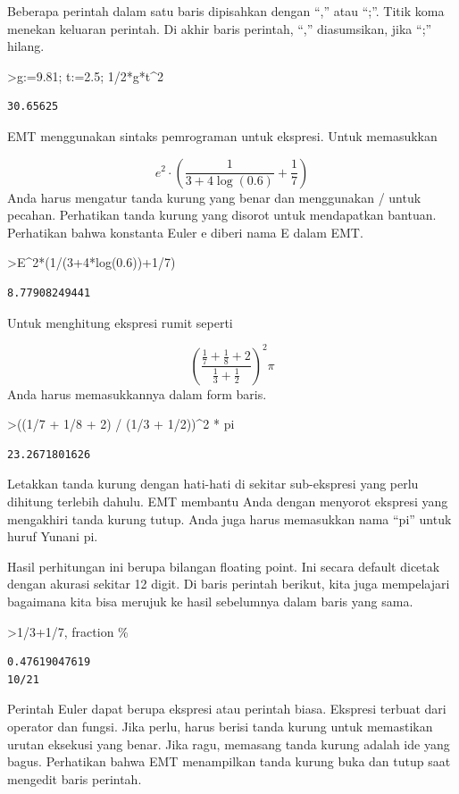 \documentclass[
]{book}
\begin{document}
Beberapa perintah dalam satu baris dipisahkan dengan ``,'' atau ``;''. Titik koma menekan keluaran perintah. Di akhir baris perintah, ``,'' diasumsikan, jika ``;'' hilang.

\textgreater g:=9.81; t:=2.5; 1/2*g*t\^{}2

\begin{verbatim}
30.65625
\end{verbatim}

EMT menggunakan sintaks pemrograman untuk ekspresi. Untuk memasukkan

\[e^2 \cdot \left( \frac{1}{3+4 \log(0.6)}+\frac{1}{7} \right)\]Anda harus mengatur tanda kurung yang benar dan menggunakan / untuk pecahan. Perhatikan tanda kurung yang disorot untuk mendapatkan bantuan. Perhatikan bahwa konstanta Euler e diberi nama E dalam EMT.

\textgreater E\^{}2*(1/(3+4*log(0.6))+1/7)

\begin{verbatim}
8.77908249441
\end{verbatim}

Untuk menghitung ekspresi rumit seperti

\[\left(\frac{\frac17 + \frac18 + 2}{\frac13 + \frac12}\right)^2 \pi\]Anda harus memasukkannya dalam form baris.

\textgreater((1/7 + 1/8 + 2) / (1/3 + 1/2))\^{}2 * pi

\begin{verbatim}
23.2671801626
\end{verbatim}

Letakkan tanda kurung dengan hati-hati di sekitar sub-ekspresi yang perlu dihitung terlebih dahulu. EMT membantu Anda dengan menyorot ekspresi yang mengakhiri tanda kurung tutup. Anda juga harus memasukkan nama ``pi'' untuk huruf Yunani pi.

Hasil perhitungan ini berupa bilangan floating point. Ini secara default dicetak dengan akurasi sekitar 12 digit. Di baris perintah berikut, kita juga mempelajari bagaimana kita bisa merujuk ke hasil sebelumnya dalam baris yang sama.

\textgreater1/3+1/7, fraction \%

\begin{verbatim}
0.47619047619
10/21
\end{verbatim}

Perintah Euler dapat berupa ekspresi atau perintah biasa. Ekspresi terbuat dari operator dan fungsi. Jika perlu, harus berisi tanda kurung untuk memastikan urutan eksekusi yang benar. Jika ragu, memasang tanda kurung adalah ide yang bagus. Perhatikan bahwa EMT menampilkan tanda kurung buka dan tutup saat mengedit baris perintah.
\end{document}
